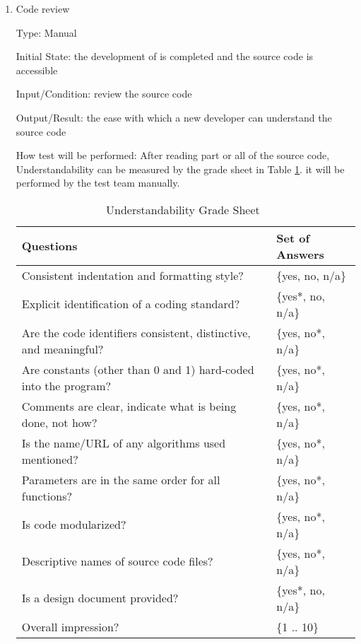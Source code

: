 \documentclass[12pt, titlepage]{article}
\begin{document}
\begin{enumerate}

\item{Code review}

Type: Manual
					
Initial State: the development of \progname{} is completed and the source code is accessible
					
Input/Condition: review the source code
					
Output/Result: the ease
with which a new developer can understand the source code
					
How test will be performed: After reading part or all of the source code, Understandability can be measured by the grade sheet in Table \ref{Tb_understandable}. it  will  be  performed  by  the  test  team manually.

\begin{table}[h]
\begin{tabular}{@{}ll@{}}
\toprule
Questions & Set of Answers \\ \midrule
Consistent indentation and formatting style? & \{yes, no, n/a\} \\
Explicit identification of a coding standard? & \{yes*, no, n/a\} \\
Are the code identifiers consistent, distinctive, and meaningful? & \{yes, no*, n/a\} \\
Are constants (other than 0 and 1) hard-coded into the program? & \{yes, no*, n/a\} \\
Comments are clear, indicate what is being done, not how? & \{yes, no*, n/a\} \\
Is the name/URL of any algorithms used mentioned? & \{yes, no*, n/a\} \\
Parameters are in the same order for all functions? & \{yes, no*, n/a\} \\
Is code modularized? & \{yes, no*, n/a\} \\
Descriptive names of source code files? & \{yes, no*, n/a\} \\
Is a design document provided? & \{yes*, no, n/a\} \\
Overall impression? & \{1 .. 10\} \\ \bottomrule
\end{tabular}
\caption{Understandability Grade Sheet~\cite{SmithEtAl2018}}
\label{Tb_understandable}
\end{table}


\end{enumerate}
\end{document}
